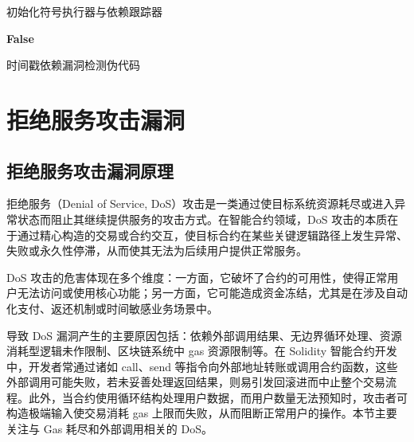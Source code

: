 \documentclass[print, master, vlined, timesmath]{DissertUESTC}
\begin{document}
\begin{algorithm}[H]
    
    初始化符号执行器与依赖跟踪器\;
    
    
    \Return \textbf{False}
    \caption{时间戳依赖漏洞检测伪代码}
    \label{alg:timestamp-dependency-detection}
\end{algorithm}
    
\section{拒绝服务攻击漏洞}
\subsection{拒绝服务攻击漏洞原理}

拒绝服务（Denial of Service, DoS）攻击是一类通过使目标系统资源耗尽或进入异常状态而阻止其继续提供服务的攻击方式。在智能合约领域，DoS 攻击的本质在于通过精心构造的交易或合约交互，使目标合约在某些关键逻辑路径上发生异常、失败或永久性停滞，从而使其无法为后续用户提供正常服务。

DoS 攻击的危害体现在多个维度：一方面，它破坏了合约的可用性，使得正常用户无法访问或使用核心功能；另一方面，它可能造成资金冻结，尤其是在涉及自动化支付、返还机制或时间敏感业务场景中。

导致 DoS 漏洞产生的主要原因包括：依赖外部调用结果、无边界循环处理、资源消耗型逻辑未作限制、区块链系统中 gas 资源限制等。在 Solidity 智能合约开发中，开发者常通过诸如 call、send 等指令向外部地址转账或调用合约函数，这些外部调用可能失败，若未妥善处理返回结果，则易引发回滚进而中止整个交易流程。此外，当合约使用循环结构处理用户数据，而用户数量无法预知时，攻击者可构造极端输入使交易消耗 gas 上限而失败，从而阻断正常用户的操作。本节主要关注与 Gas 耗尽和外部调用相关的 DoS。
\end{document}
